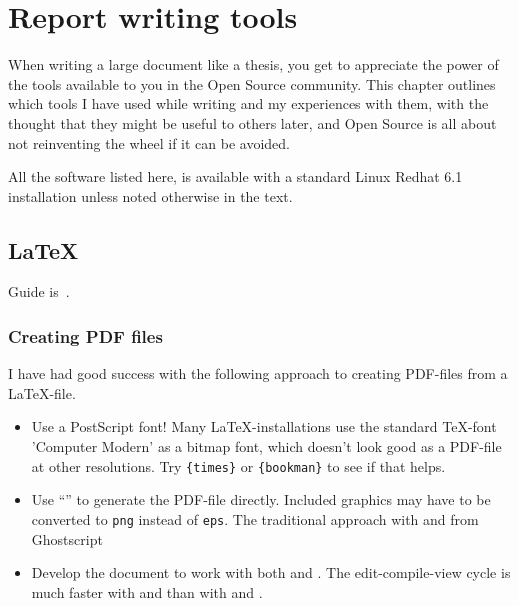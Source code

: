 
\chapter{Report writing tools}

When writing a large document like a thesis, you get to appreciate the
power of the tools available to you in the Open Source community.
This chapter outlines which tools I have used while writing and my
experiences with them, with the thought that they might be useful to
others later, and Open Source is all about not reinventing the wheel
if it can be avoided.  

All the software listed here, is available with a standard Linux
Redhat 6.1 installation unless noted otherwise in the text.


\section{\LaTeX}
\label{sec:report-writing-tools-latex}


Guide is~\cite{a-guide-to-latex}.


\subsection{Creating PDF files}
\label{sec:report-writing-creating-pdf-files}

I have had good success with the following approach to creating
PDF-files from a \LaTeX-file.

\begin{itemize}
\item Use a PostScript font!  Many \LaTeX-installations use the
  standard \TeX-font 'Computer Modern' as a bitmap font, which doesn't
  look good as a PDF-file at other resolutions.   Try
  \texttt{\{times\}} or
  \texttt{\{bookman\}} to see if that helps.
\item Use ``'' to generate the PDF-file
  directly.  Included graphics may have to be converted to
  \texttt{png} instead of \texttt{eps}.  The traditional approach with
   and  \textsf{from
    Ghostscript}
\item Develop the document to work with both  and
  .  The edit-compile-view cycle is much faster
  with  and  than with
   and .
\end{itemize}

